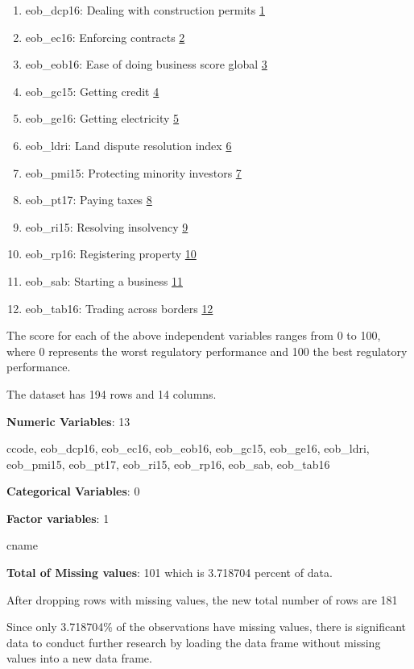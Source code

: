 \documentclass[
]{article}
\begin{document}
\begin{enumerate}
\def\labelenumi{\arabic{enumi}.}
\item
  eob\_dcp16: Dealing with construction permits \protect\hyperlink{1}{1}
\item
  eob\_ec16: Enforcing contracts \protect\hyperlink{2}{2}
\item
  eob\_eob16: Ease of doing business score global
  \protect\hyperlink{3}{3}
\item
  eob\_gc15: Getting credit \protect\hyperlink{4}{4}
\item
  eob\_ge16: Getting electricity \protect\hyperlink{5}{5}
\item
  eob\_ldri: Land dispute resolution index \protect\hyperlink{6}{6}
\item
  eob\_pmi15: Protecting minority investors \protect\hyperlink{7}{7}
\item
  eob\_pt17: Paying taxes \protect\hyperlink{8}{8}
\item
  eob\_ri15: Resolving insolvency \protect\hyperlink{9}{9}
\item
  eob\_rp16: Registering property \protect\hyperlink{10}{10}
\item
  eob\_sab: Starting a business \protect\hyperlink{11}{11}
\item
  eob\_tab16: Trading across borders \protect\hyperlink{12}{12}
\end{enumerate}

The score for each of the above independent variables ranges from 0 to
100, where 0 represents the worst regulatory performance and 100 the
best regulatory performance.

The dataset has 194 rows and 14 columns.

\textbf{Numeric Variables}: 13

ccode, eob\_dcp16, eob\_ec16, eob\_eob16, eob\_gc15, eob\_ge16,
eob\_ldri, eob\_pmi15, eob\_pt17, eob\_ri15, eob\_rp16, eob\_sab,
eob\_tab16

\textbf{Categorical Variables}: 0

\textbf{Factor variables}: 1

cname

\textbf{Total of Missing values}: 101 which is 3.718704 percent of data.

After dropping rows with missing values, the new total number of rows
are 181

Since only 3.718704\% of the observations have missing values, there is
significant data to conduct further research by loading the data frame
without missing values into a new data frame.
\end{document}
